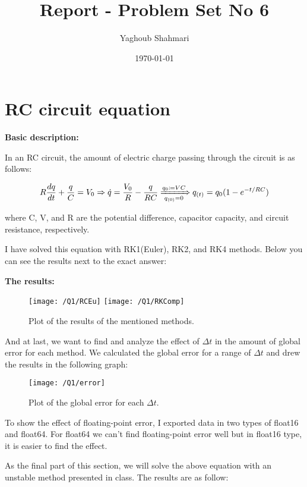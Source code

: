 \documentclass{article}
\author{Yaghoub Shahmari}
\title{Report - Problem Set No 6}
\date{\today}
\begin{document}
    \maketitle
    \section{RC circuit equation}
    \textbf{Basic description:}

    In an RC circuit, the amount of electric charge passing through the circuit is as follows:

    $$R \frac{d q}{d t}+\frac{q}{C}=V_0 \Rightarrow \dot{q} = \frac{V_0}{R} - \frac{q}{RC}  \xRightarrow[q_{(0)} = 0]{q_0 \coloneqq V C} q_{(t)}=q_0 (1-e^{-t/RC})$$

    where C, V, and R are the potential difference, capacitor capacity, and circuit resistance, respectively.
    
    I have solved this equation with RK1(Euler), RK2, and RK4 methods. Below you can see the results next to the exact answer:

    \textbf{The results:}

    \begin{figure}[!htb]
        \centering
        \texttt{[image: /Q1/RCEu]}
        \label{fig:1.1}
        \texttt{[image: /Q1/RKComp]}
        \label{fig:1.2}
        \caption{Plot of the results of the mentioned methods.}
    \end{figure}

    \pagebreak

    And at last, we want to find and analyze the effect of $\Delta t$ in the amount of global error for each method.
    We calculated the global error for a range of $\Delta t$ and drew the results in the following graph:

    \begin{figure}[!htb]
        \centering
        \texttt{[image: /Q1/error]}
        \label{fig:1.3}
        \caption{Plot of the global error for each $\Delta t$.}
    \end{figure}

    To show the effect of floating-point error,
    I exported data in two types of float16 and float64.
    For float64 we can't find floating-point error well but in float16 type,
    it is easier to find the effect.

    As the final part of this section, we will solve the above equation with an unstable method presented in class. The results are as follow:
\end{document}
